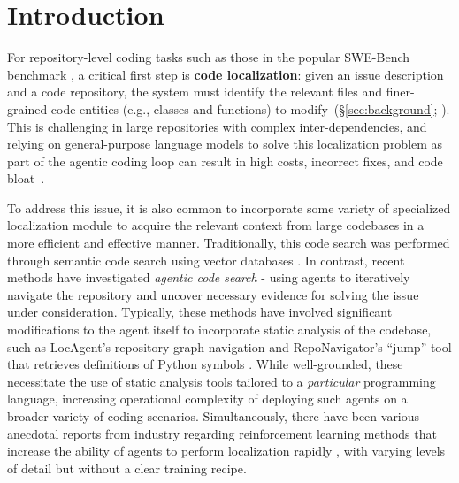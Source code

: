 \section{Introduction}



For repository-level coding tasks such as those in the popular SWE-Bench benchmark \citep{jimenez2024swebenchlanguagemodelsresolve}, a critical first step is \textbf{code localization}: given an issue description and a code repository, the system must identify the relevant files and finer-grained code entities (e.g., classes and functions) to modify~(\S\ref{sec:background}; \citet{husain2019codesearchnet,xia2024agentless}).
This is challenging in large repositories with complex inter-dependencies, and relying on general-purpose language models to solve this localization problem as part of the agentic coding loop can result in high costs, incorrect fixes, and code bloat~\citep{hong2025context}.

To address this issue, it is also common to incorporate some variety of specialized localization module to acquire the relevant context from large codebases in a more efficient and effective manner.
Traditionally, this code search was performed through semantic code search using vector databases \citep{xia2024agentless,wang2025coderag,xie2025swe}. In contrast, recent methods have investigated \emph{agentic code search} - using agents to iteratively navigate the repository and uncover necessary evidence for solving the issue under consideration.
Typically, these methods have involved significant modifications to the agent itself to incorporate static analysis of the codebase, such as LocAgent's repository graph navigation \citep{chen-etal-2025-locagent} and RepoNavigator's ``jump'' tool that retrieves definitions of Python symbols \citep{zhang2025one}.
While well-grounded, these necessitate the use of static analysis tools tailored to a \emph{particular} programming language, increasing operational complexity of deploying such agents on a broader variety of coding scenarios.
Simultaneously, there have been various anecdotal reports from industry regarding reinforcement learning methods that increase the ability of agents to perform localization rapidly \citep{cognition2025swegrep,cursor2025composer}, with varying levels of detail but without a clear training recipe.

